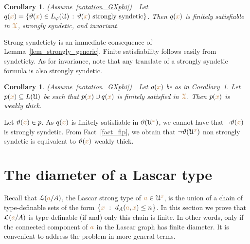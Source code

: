 \documentclass[10pt,openany]{amsproc}
\makeatletter
\def\X{\EuScript X}
\def\U{\EuScript U}
\def\Ll{\EuScript L}
\def\theta{\vartheta}
\def\phi{\varphi}
\newcounter{thm}
\theoremstyle{mio}
\newtheorem{corollary}[thm]{Corollary}\tcolorboxenvironment{corollary}{mythm}
\providecommand{\proofNameStyle}{\bfseries}
\renewenvironment{proof}[1][\proofname]{\par
  \pushQED{\qed}%
  \normalfont%
  \trivlist
  \item[\hskip\labelsep
        \proofNameStyle
    #1\@addpunct{.}]\ignorespaces
}{%
  \popQED\endtrivlist\@endpefalse
}
\def\mr{\color{brown}}
\def\mrX{{\mr\X}}
\makeatother
\begin{document}
\begin{corollary}\label{corol_str_gen}
  (Assume~\ref{notation_GXphi})\ \  
  Let $q({\mr x})=\{\theta({\mr x})\in L_\phi(\U)\,:\, \theta({\mr x})\textrm{ strongly syndetic}\}$.
  Then $q({\mr x})$ is finitely satisfiable in $\mrX$, strongly syndetic, and invariant.
\end{corollary}

\begin{proof}
  Strong syndeticty is an immediate consequence of Lemma~\ref{lem_strongly_generic}.
  Finite satisfiability follows easily from syndeticty.
  As for invariance, note that any translate of a strongly syndetic formula is also strongly syndetic.
\end{proof}

\begin{corollary}\label{corol_q_w_pers}
  (Assume~\ref{notation_GXphi})\ \  
  Let $q({\mr x})$ be as in Corollary~\ref{corol_str_gen}.
  Let $p({\mr x})\subseteq L(\U)$ be such that $p({\mr x})\cup q({\mr x})$ is finitely satisfied in $\mrX$.
  Then $p({\mr x})$ is weakly thick.
\end{corollary}

\begin{proof}
  Let $\theta({\mr x})\in p$.
  As $q({\mr x})$ is finitely satisfiable in $\theta(\U^{\mr x})$, we cannot have that $\neg\theta({\mr x})$ is strongly syndetic.
  From Fact~\ref{fact_fip}, we obtain that $\neg\theta(\U^{\mr x})$ non strongly syndetic is equivalent to $\theta({\mr x})$ weakly thick.
\end{proof}



\section{The diameter of a Lascar type}\label{newelski}

Recall that $\Ll({\mr a}/A)$, the Lascar strong type of ${\mr a}\in\U^{\mr x}$, is the union of a chain of type-definable sets of the form $\big\{{\mr x}\ :\ d_A({\mr a},{\mr x})\le n\big\}$.
In this section we prove that $\Ll({\mr a}/A)$ is type-definable (if and) only this chain is finite.
In other words, only if the connected component of ${\mr a}$ in the Lascar graph has finite diameter.
It is convenient to address the problem in more general terms.
\end{document}
